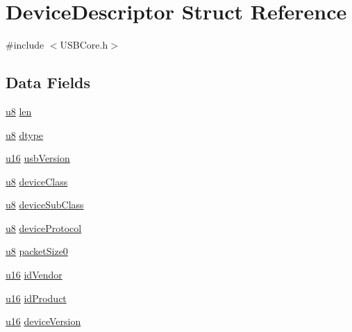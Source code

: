 \hypertarget{struct_device_descriptor}{}\section{Device\+Descriptor Struct Reference}
\label{struct_device_descriptor}


{\ttfamily \#include $<$U\+S\+B\+Core.\+h$>$}

\subsection*{Data Fields}
\begin{DoxyCompactItemize}
\item 
\hyperlink{_u_s_b_a_p_i_8h_aed742c436da53c1080638ce6ef7d13de}{u8} \hyperlink{struct_device_descriptor_afbf3f3230446569534d5f466aaf4c23b}{len}
\item 
\hyperlink{_u_s_b_a_p_i_8h_aed742c436da53c1080638ce6ef7d13de}{u8} \hyperlink{struct_device_descriptor_a0bb419531ec75697e63e9109fecf81b0}{dtype}
\item 
\hyperlink{_u_s_b_a_p_i_8h_a9e6c91d77e24643b888dbd1a1a590054}{u16} \hyperlink{struct_device_descriptor_a0d9dca86e0ffcd6d89828e4b8b0eb8a0}{usb\+Version}
\item 
\hyperlink{_u_s_b_a_p_i_8h_aed742c436da53c1080638ce6ef7d13de}{u8} \hyperlink{struct_device_descriptor_ac951c25b0d755d42cb5f4a13692d511c}{device\+Class}
\item 
\hyperlink{_u_s_b_a_p_i_8h_aed742c436da53c1080638ce6ef7d13de}{u8} \hyperlink{struct_device_descriptor_a243c174d359ded5ed54cf06d979cab2a}{device\+Sub\+Class}
\item 
\hyperlink{_u_s_b_a_p_i_8h_aed742c436da53c1080638ce6ef7d13de}{u8} \hyperlink{struct_device_descriptor_a1fd727fcfe6f95b1da93b158569777dd}{device\+Protocol}
\item 
\hyperlink{_u_s_b_a_p_i_8h_aed742c436da53c1080638ce6ef7d13de}{u8} \hyperlink{struct_device_descriptor_a8ccac084f7a6348f5719d6081fcc044e}{packet\+Size0}
\item 
\hyperlink{_u_s_b_a_p_i_8h_a9e6c91d77e24643b888dbd1a1a590054}{u16} \hyperlink{struct_device_descriptor_a7a7c71d161c32f997811107e4d546ca8}{id\+Vendor}
\item 
\hyperlink{_u_s_b_a_p_i_8h_a9e6c91d77e24643b888dbd1a1a590054}{u16} \hyperlink{struct_device_descriptor_a519c2f3b9ade6de6e761b4ada00d31b9}{id\+Product}
\item 
\hyperlink{_u_s_b_a_p_i_8h_a9e6c91d77e24643b888dbd1a1a590054}{u16} \hyperlink{struct_device_descriptor_a780fae31c7a1fa955206f55f2a069f02}{device\+Version}

\end{DoxyCompactItemize}
